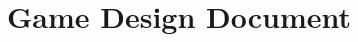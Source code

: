 \chapter{Game Design Document} \label{apendice:gdd}
\noindent
\setlength{\parindent}{0pt}

\cleardoublepage

 

